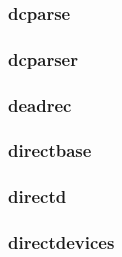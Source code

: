 \documentclass[a4paper]{article}
\begin{document}
\hypertarget{RefHeading17671167907073}{}\subsubsection{}
\clearpage\subsubsection[dcparse]{dcparse}
\hypertarget{RefHeading17691167907073}{}\subsubsection{}
\clearpage\subsubsection[dcparser]{dcparser}
\hypertarget{RefHeading17711167907073}{}\subsubsection{}
\clearpage\subsubsection[deadrec]{deadrec}
\hypertarget{RefHeading17731167907073}{}\subsubsection{}
\clearpage\subsubsection[directbase]{directbase}
\hypertarget{RefHeading17751167907073}{}\subsubsection{}
\clearpage\subsubsection[directd]{directd}
\hypertarget{RefHeading17771167907073}{}\subsubsection{}
\clearpage\subsubsection[directdevices]{directdevices}
\hypertarget{RefHeading17791167907073}{}\subsubsection{}
\end{document}
